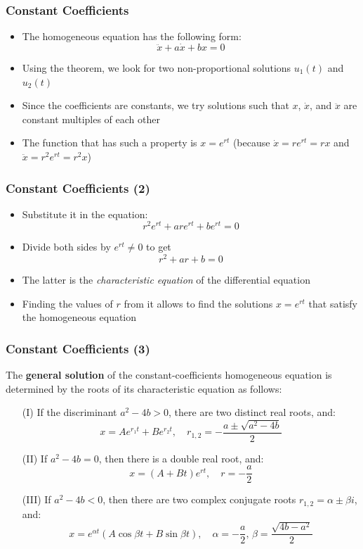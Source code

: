 \documentclass[10pt,usenames,dvipsnames]{beamer}
\theoremstyle{definition}
\begin{document}
\begin{frame}[fragile]
\frametitle{Constant Coefficients}
\begin{itemize}
	\item The homogeneous equation has the following form:
	\[
		\ddot{x} + a\dot{x} + bx = 0
	\]
	\item Using the theorem, we look for two non-proportional solutions $u_{1}(t)$ and $u_{2}(t)$
	\item Since the coefficients are constants, we try solutions such that $x$, $\dot{x}$, and $\ddot{x}$ are constant multiples of each other
	\item The function that has such a property is $x = e^{rt}$ (because $\dot{x} = re^{rt} = rx$ and $\ddot{x} = r^{2}e^{rt} = r^{2}x$)
\end{itemize}
\end{frame}

\begin{frame}[fragile]
\frametitle{Constant Coefficients (2)}
\begin{itemize}
	\item Substitute it in the equation:
	\[
		r^{2}e^{rt} + are^{rt} + be^{rt} = 0
	\]
	\item Divide both sides by $e^{rt} \neq 0$ to get
	\[
		r^{2} + ar + b = 0
	\]
	\item The latter is the \textit{characteristic equation} of the differential equation
	\item Finding the values of $r$ from it allows to find the solutions $x = e^{rt}$ that satisfy the homogeneous equation
\end{itemize}
\end{frame}

\begin{frame}[fragile]
\frametitle{Constant Coefficients (3)}
\begin{theorem}
	The \textbf{general solution} of the constant-coefficients homogeneous equation is determined by the roots of its characteristic equation as follows:
	\begin{enumerate}
		\item[(I)] If the discriminant $a^{2} - 4b > 0$, there are two distinct real roots, and:
		\[
			x = Ae^{r_{1}t} + Be^{r_{2}t}, \quad r_{1,2} = -\dfrac{a \pm \sqrt{a^{2} - 4b}}{2}  
		\]
		\item[(II)] If $a^{2} - 4b = 0$, then there is a double real root, and:
		\[
			x = (A + Bt)e^{rt}, \quad r = -\dfrac{a}{2}
		\]
		\item[(III)] If $a^{2} - 4b < 0$, then there are two complex conjugate roots $r_{1,2} = \alpha \pm \beta i$, and:
		\[
			x = e^{\alpha t}(A\cos \beta t + B\sin \beta t),\quad \alpha = -\dfrac{a}{2}, \, \beta = \dfrac{\sqrt{4b - a^{2}}}{2}
		\]
	\end{enumerate}
\end{theorem}
\end{frame}
\end{document}
